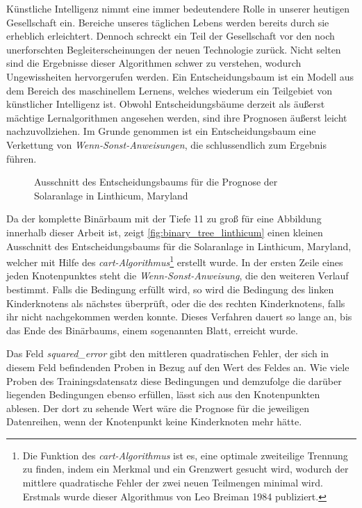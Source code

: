 \documentclass[12pt, a4paper]{article}
\begin{document}
Künstliche Intelligenz nimmt eine immer bedeutendere Rolle in unserer heutigen Gesellschaft ein. Bereiche unseres täglichen Lebens werden bereits durch sie erheblich erleichtert. Dennoch schreckt ein Teil der Gesellschaft vor den noch unerforschten Begleiterscheinungen der neuen Technologie zurück. Nicht selten sind die Ergebnisse dieser Algorithmen schwer zu verstehen, wodurch Ungewissheiten hervorgerufen werden. 
Ein Entscheidungsbaum ist ein Modell aus dem Bereich des maschinellem Lernens, welches wiederum ein Teilgebiet von künstlicher Intelligenz ist. Obwohl Entscheidungsbäume derzeit als äußerst mächtige Lernalgorithmen angesehen werden, sind ihre Prognosen äußerst leicht nachzuvollziehen. Im Grunde genommen ist ein Entscheidungsbaum eine Verkettung von \textit{Wenn-Sonst-Anweisungen}, die schlussendlich zum Ergebnis führen. 

\begin{figure}[H]
\centering
\def\svgwidth{425pt}

\caption{Ausschnitt des Entscheidungsbaums für die Prognose der Solaranlage in Linthicum, Maryland}
\label{fig:binary_tree_linthicum}
\end {figure}

Da der komplette Binärbaum mit der Tiefe 11 zu groß für eine Abbildung innerhalb dieser Arbeit ist, zeigt \autoref{fig:binary_tree_linthicum} einen kleinen Ausschnitt des Entscheidungsbaums für die Solaranlage in Linthicum, Maryland, welcher mit Hilfe des \textit{\ac{cart}-Algorithmus}\footnote{Die Funktion des \textit{\ac{cart}-Algorithmus} ist es, eine optimale zweiteilige Trennung zu finden, indem ein Merkmal und ein Grenzwert gesucht wird, wodurch der mittlere quadratische Fehler der zwei neuen Teilmengen minimal wird. Erstmals wurde dieser Algorithmus von Leo Breiman 1984 publiziert.} erstellt wurde. In der ersten Zeile eines jeden Knotenpunktes steht die \textit{Wenn-Sonst-Anweisung}, die den weiteren Verlauf bestimmt. Falls die Bedingung erfüllt wird, so wird die Bedingung des linken Kinderknotens als nächstes überprüft, oder die des rechten Kinderknotens, falls ihr nicht nachgekommen werden konnte. Dieses Verfahren dauert so lange an, bis das Ende des Binärbaums, einem sogenannten Blatt, erreicht wurde.

Das Feld \textit{squared\_error} gibt den mittleren quadratischen Fehler, der sich in diesem Feld befindenden Proben in Bezug auf den Wert des Feldes an. Wie viele Proben des Trainingsdatensatz diese Bedingungen und demzufolge die darüber liegenden Bedingungen ebenso erfüllen, lässt sich aus den Knotenpunkten ablesen. Der dort zu sehende Wert wäre die Prognose für die jeweiligen Datenreihen, wenn der Knotenpunkt keine Kinderknoten mehr hätte.
\end{document}
